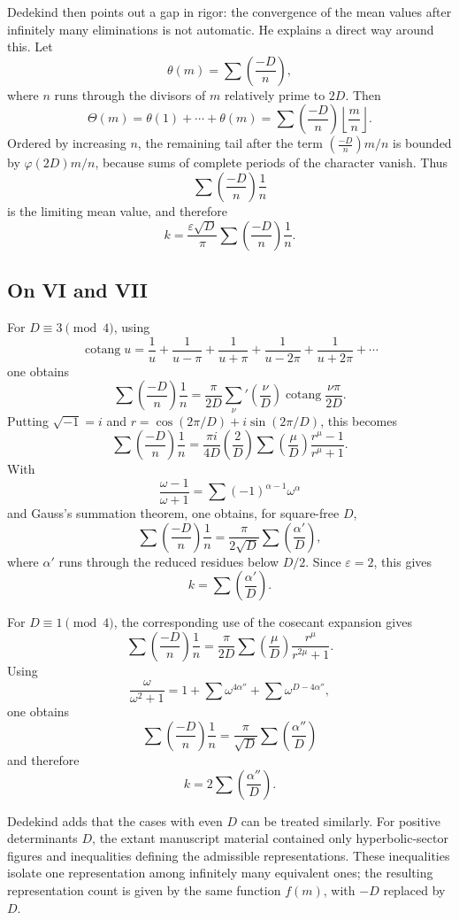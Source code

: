 \documentclass[12pt]{article}
\newcommand{\cotang}{\operatorname{cotang}}
\begin{document}
Dedekind then points out a gap in rigor: the convergence of the mean values after infinitely many eliminations is not automatic. He explains a direct way around this. Let
\[
\theta(m)=\sum\left(\frac{-D}{n}\right),
\]
where \(n\) runs through the divisors of \(m\) relatively prime to \(2D\). Then
\[
\Theta(m)=\theta(1)+\cdots+\theta(m)
=\sum\left(\frac{-D}{n}\right)\left\lfloor\frac mn\right\rfloor.
\]
Ordered by increasing \(n\), the remaining tail after the term \(\left(\frac{-D}{n}\right)m/n\) is bounded by \(\varphi(2D)m/n\), because sums of complete periods of the character vanish. Thus
\[
\sum\left(\frac{-D}{n}\right)\frac1n
\]
is the limiting mean value, and therefore
\[
k=\frac{\varepsilon\sqrt D}{\pi}\sum\left(\frac{-D}{n}\right)\frac1n.
\]

\subsection*{On VI and VII}

For \(D\equiv3\pmod4\), using
\[
\cotang u=\frac1u+\frac1{u-\pi}+\frac1{u+\pi}+\frac1{u-2\pi}+\frac1{u+2\pi}+\cdots
\]
one obtains
\[
\sum\left(\frac{-D}{n}\right)\frac1n
=\frac{\pi}{2D}\sum_{\nu}'\left(\frac{\nu}{D}\right)\cotang\frac{\nu\pi}{2D}.
\]
Putting \(\sqrt{-1}=i\) and \(r=\cos(2\pi/D)+i\sin(2\pi/D)\), this becomes
\[
\sum\left(\frac{-D}{n}\right)\frac1n
=\frac{\pi i}{4D}\left(\frac{2}{D}\right)
\sum\left(\frac{\mu}{D}\right)\frac{r^\mu-1}{r^\mu+1}.
\]
With
\[
\frac{\omega-1}{\omega+1}=\sum (-1)^{\alpha-1}\omega^\alpha
\]
and Gauss's summation theorem, one obtains, for square-free \(D\),
\[
\sum\left(\frac{-D}{n}\right)\frac1n
=\frac{\pi}{2\sqrt D}\sum\left(\frac{\alpha'}{D}\right),
\]
where \(\alpha'\) runs through the reduced residues below \(D/2\). Since \(\varepsilon=2\), this gives
\[
k=\sum\left(\frac{\alpha'}{D}\right).
\]

For \(D\equiv1\pmod4\), the corresponding use of the cosecant expansion gives
\[
\sum\left(\frac{-D}{n}\right)\frac1n
=\frac{\pi}{2D}\sum\left(\frac{\mu}{D}\right)\frac{r^\mu}{r^{2\mu}+1}.
\]
Using
\[
\frac{\omega}{\omega^2+1}=1+\sum \omega^{4\alpha''}+\sum\omega^{D-4\alpha''},
\]
one obtains
\[
\sum\left(\frac{-D}{n}\right)\frac1n
=\frac{\pi}{\sqrt D}\sum\left(\frac{\alpha''}{D}\right)
\]
and therefore
\[
k=2\sum\left(\frac{\alpha''}{D}\right).
\]

Dedekind adds that the cases with even \(D\) can be treated similarly. For positive determinants \(D\), the extant manuscript material contained only hyperbolic-sector figures and inequalities defining the admissible representations. These inequalities isolate one representation among infinitely many equivalent ones; the resulting representation count is given by the same function \(f(m)\), with \(-D\) replaced by \(D\).
\end{document}
